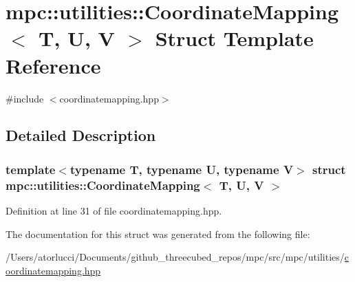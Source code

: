 \hypertarget{structmpc_1_1utilities_1_1_coordinate_mapping}{}\section{mpc\+:\+:utilities\+:\+:Coordinate\+Mapping$<$ T, U, V $>$ Struct Template Reference}
\label{structmpc_1_1utilities_1_1_coordinate_mapping}


{\ttfamily \#include $<$coordinatemapping.\+hpp$>$}



\subsection{Detailed Description}
\subsubsection*{template$<$typename T, typename U, typename V$>$\newline
struct mpc\+::utilities\+::\+Coordinate\+Mapping$<$ T, U, V $>$}



Definition at line 31 of file coordinatemapping.\+hpp.



The documentation for this struct was generated from the following file\+:\begin{DoxyCompactItemize}
\item 
/\+Users/atorlucci/\+Documents/github\+\_\+threecubed\+\_\+repos/mpc/src/mpc/utilities/\mbox{\hyperlink{coordinatemapping_8hpp}{coordinatemapping.\+hpp}}\end{DoxyCompactItemize}
